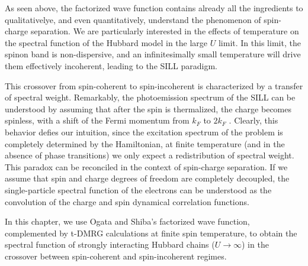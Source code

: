 \documentclass[article,11pt]{revtex4}
\begin{document}
As seen above, the factorized wave function contains already all the ingredients to qualitativelye, and even quantitatively, understand the phenomenon of spin-charge separation. We are particularly interested in the effects of temperature on the spectral function of the Hubbard model in the large $U$ limit.
In this limit, the spinon band is non-dispersive, and an infinitesimally small temperature will drive them effectively incoherent, leading to the SILL paradigm.

This crossover from spin-coherent to spin-incoherent is characterized by a transfer of spectral weight. Remarkably, the photoemission spectrum of the SILL can be understood by assuming that after the spin is thermalized, the charge becomes spinless, with a shift of the Fermi momentum from $k_F$ to $2k_F$ \cite{Feiguin2011}. 
Clearly, this behavior defies our intuition, since the excitation spectrum of the problem is completely determined by the Hamiltonian, at finite temperature (and in the absence of phase transitions) we only expect a redistribution of spectral weight. This paradox can be reconciled in the context of spin-charge separation. If we assume that spin and charge degrees of freedom are completely decoupled, the single-particle spectral function of the electrons can be understood as the convolution of the charge and spin dynamical correlation functions. 

In this chapter, we use Ogata and Shiba's factorized wave function\cite{Ogata1990}, complemented by t-DMRG calculations at finite spin temperature, to obtain the spectral function of strongly interacting Hubbard chains ($U\rightarrow\infty$) in the crossover between spin-coherent and spin-incoherent regimes. 
\end{document}
